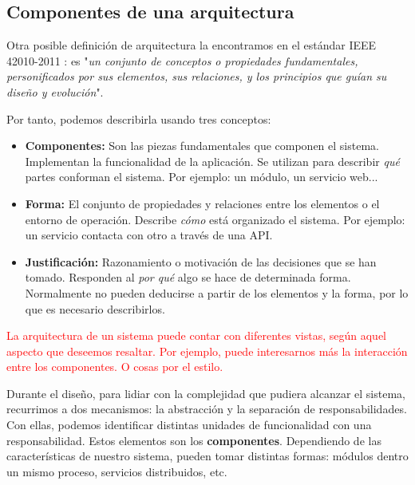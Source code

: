 \subsection{Componentes de una arquitectura}

Otra posible definición de arquitectura la encontramos en el estándar IEEE 42010-2011 \cite{ieeeStandard420102011Systems2011}: es "\textit{un conjunto de conceptos o propiedades fundamentales, personificados por sus elementos, sus relaciones, y los principios que guían su diseño y evolución}".

Por tanto, podemos describirla usando tres conceptos: \cite{perryFoundationsStudySoftware1992}

    \begin{itemize}
        \item \textbf{Componentes:} Son las piezas fundamentales que componen el sistema. Implementan la funcionalidad de la aplicación. Se utilizan para describir \textit{qué} partes conforman el sistema. Por ejemplo: un módulo, un servicio web...

        \item \textbf{Forma:} El conjunto de propiedades y relaciones entre los elementos o el entorno de operación. Describe \textit{cómo} está organizado el sistema. Por ejemplo: un servicio contacta con otro a través de una API.

        \item \textbf{Justificación:} Razonamiento o motivación de las decisiones que se han tomado. Responden al \textit{por qué} algo se hace de determinada forma. Normalmente no pueden deducirse a partir de los elementos y la forma, por lo que es necesario describirlos.

    \end{itemize}

\textcolor{red}{La arquitectura de un sistema puede contar con diferentes vistas, según aquel aspecto que deseemos resaltar. Por ejemplo, puede interesarnos más la interacción entre los componentes. O cosas por el estilo.}

Durante el diseño, para lidiar con la complejidad que pudiera alcanzar el sistema, recurrimos a dos mecanismos: la abstracción y la separación de responsabilidades. \cite{martinCleanArchitectureCraftsman2018} Con ellas, podemos identificar distintas unidades de funcionalidad con una responsabilidad. \cite{taylorSoftwareArchitectureFoundations2009} Estos elementos son los \textbf{componentes}. Dependiendo de las características de nuestro sistema, pueden tomar distintas formas: módulos dentro un mismo proceso, servicios distribuidos, etc.


